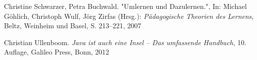 \begin{thebibliography}{ABCDEF}



Christine Schwarzer, Petra Buchwald. "{Umlernen und Dazulernen}.", In: Michael Göhlich, Christoph Wulf, Jörg Zirfas (Hrsg.): \emph{Pädagogische Theorien des Lernens}, Beltz, Weinheim und Basel,  S. 213--221, 2007




Christian Ullenboom. \emph{Java ist auch eine Insel -- Das umfassende Handbuch}, 10. Auflage, Galileo Press, Bonn, 2012


\end{thebibliography}